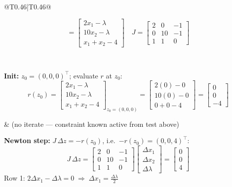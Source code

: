 \documentclass[10pt,a3paper]{article}
\begin{document}
\begin{minipage}[t]{0.48\linewidth}
\begin{tabular}{@{}T{0.46\linewidth}|T{0.46\linewidth}@{}}
\begin{minipage}[t]{\linewidth}
\[    = \begin{bmatrix} 2x_1-\lambda \\ 10x_2-\lambda \\ x_1+x_2-4 \end{bmatrix}
  \quad
  J = \begin{bmatrix} 2&0&-1\\0&10&-1\\1&1&0 \end{bmatrix}
\]
\end{minipage}
\\\hline
\begin{minipage}[t]{\linewidth}
\textbf{Init:} $z_0=(0,0,0)^\top$; evaluate $r$ at $z_0$:
\[
  r(z_0) = \begin{bmatrix}2x_1-\lambda\\10x_2-\lambda\\x_1+x_2-4\end{bmatrix}_{z_0=(0,0,0)}
  = \begin{bmatrix}2(0)-0\\10(0)-0\\0+0-4\end{bmatrix}
  = \begin{bmatrix}0\\0\\-4\end{bmatrix}
\]
\end{minipage}
&
{\footnotesize (no iterate — constraint known active from test above)}
\\[3pt]\hline
\begin{minipage}[t]{\linewidth}
\textbf{Newton step:} $J\,\Delta z=-r(z_0)$, i.e.\ $-r(z_0)=(0,0,4)^\top$:
\[
  J\,\Delta z =
  \begin{bmatrix}2&0&-1\\0&10&-1\\1&1&0\end{bmatrix}
  \begin{bmatrix}\Delta x_1\\\Delta x_2\\\Delta\lambda\end{bmatrix}
  =\begin{bmatrix}0\\0\\4\end{bmatrix}
\]
Row 1: $2\Delta x_1-\Delta\lambda=0 \;\Rightarrow\; \Delta x_1=\tfrac{\Delta\lambda}{2}$


\end{minipage}
\end{tabular}
\end{minipage}
\end{document}
